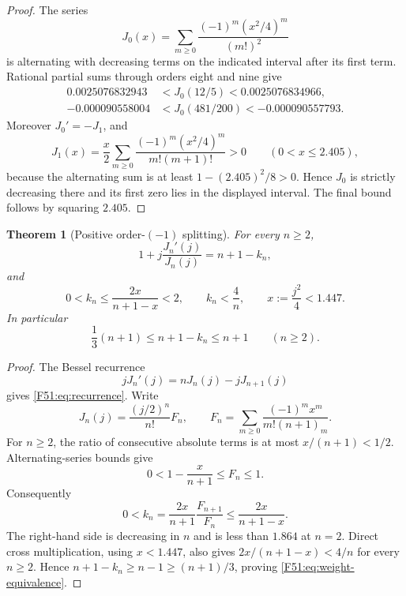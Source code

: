 \documentclass[11pt]{amsart}
\numberwithin{equation}{section}
\newtheorem{theorem}{Theorem}[section]
\theoremstyle{definition}
\theoremstyle{remark}
\begin{document}
\begin{proof}
The series
\begin{equation}
 J_0(x)=\sum_{m\ge0}\frac{(-1)^m(x^2/4)^m}{(m!)^2}
\end{equation}
is alternating with decreasing terms on the indicated interval after its
first term.  Rational partial sums through orders eight and nine give
\begin{align*}
 0.0025076832943&<J_0(12/5)<0.0025076834966,\\
 -0.000090558004&<J_0(481/200)<-0.000090557793.
\end{align*}
Moreover $J_0'=-J_1$, and
\begin{equation}
 J_1(x)=\frac x2\sum_{m\ge0}
 \frac{(-1)^m(x^2/4)^m}{m!(m+1)!}>0
 \qquad(0<x\le2.405),
\end{equation}
because the alternating sum is at least $1-(2.405)^2/8>0$.
Hence $J_0$ is strictly decreasing there and its first zero lies in the
displayed interval.  The final bound follows by squaring $2.405$.
\end{proof}

\begin{theorem}[Positive order-$(-1)$ splitting]\label{F51:thm:bessel}
For every $n\ge2$,
\begin{equation}\label{F51:eq:recurrence}
 1+j\frac{J_n'(j)}{J_n(j)}=n+1-k_n,
\end{equation}
and
\begin{equation}\label{F51:eq:k-bounds}
 0<k_n\le \frac{2x}{n+1-x}<2,
 \qquad k_n<\frac4n,
 \qquad x:=\frac{j^2}{4}<1.447.
\end{equation}
In particular
\begin{equation}\label{F51:eq:weight-equivalence}
 \frac13(n+1)\le n+1-k_n\le n+1
 \qquad(n\ge2).
\end{equation}
\end{theorem}

\begin{proof}
The Bessel recurrence
\begin{equation}
 jJ_n'(j)=nJ_n(j)-jJ_{n+1}(j)
\end{equation}
gives \eqref{F51:eq:recurrence}.  Write
\begin{equation}
 J_n(j)=\frac{(j/2)^n}{n!}F_n,
 \qquad
 F_n=\sum_{m\ge0}\frac{(-1)^mx^m}{m!(n+1)_m}.
\end{equation}
For $n\ge2$, the ratio of consecutive absolute terms is at most
$x/(n+1)<1/2$.  Alternating-series bounds give
\begin{equation}
 0<1-\frac{x}{n+1}\le F_n\le1.
\end{equation}
Consequently
\begin{equation}
 0<k_n=\frac{2x}{n+1}\frac{F_{n+1}}{F_n}
 \le\frac{2x}{n+1-x}.
\end{equation}
The right-hand side is decreasing in $n$ and is less than $1.864$ at
$n=2$.  Direct cross multiplication, using $x<1.447$, also gives
$2x/(n+1-x)<4/n$ for every $n\ge2$.  Hence
$n+1-k_n\ge n-1\ge(n+1)/3$, proving
\eqref{F51:eq:weight-equivalence}.
\end{proof}
\end{document}
